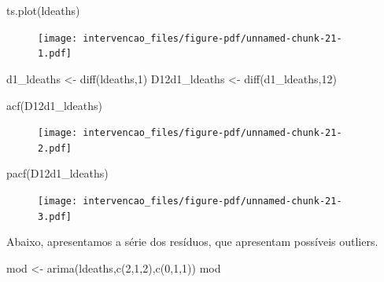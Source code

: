 \documentclass[
  letterpaper,
  DIV=11,
  numbers=noendperiod]{scrartcl}
\newenvironment{Shaded}{\begin{snugshade}}{\end{snugshade}}
\newcommand{\DecValTok}[1]{\textcolor[rgb]{0.68,0.00,0.00}{#1}}
\newcommand{\FunctionTok}[1]{\textcolor[rgb]{0.28,0.35,0.67}{#1}}
\newcommand{\NormalTok}[1]{\textcolor[rgb]{0.00,0.23,0.31}{#1}}
\newcommand{\OtherTok}[1]{\textcolor[rgb]{0.00,0.23,0.31}{#1}}
\theoremstyle{plain}
\theoremstyle{plain}
\theoremstyle{definition}
\theoremstyle{definition}
\theoremstyle{remark}
\begin{document}
\begin{Shaded}
\begin{Highlighting}[]
\FunctionTok{ts.plot}\NormalTok{(ldeaths)}
\end{Highlighting}
\end{Shaded}

\begin{figure}[H]

{\centering \texttt{[image: intervencao\_files/figure-pdf/unnamed-chunk-21-1.pdf]}

}

\end{figure}

\begin{Shaded}
\begin{Highlighting}[]
\NormalTok{d1\_ldeaths }\OtherTok{\textless{}{-}} \FunctionTok{diff}\NormalTok{(ldeaths,}\DecValTok{1}\NormalTok{)}
\NormalTok{D12d1\_ldeaths }\OtherTok{\textless{}{-}} \FunctionTok{diff}\NormalTok{(d1\_ldeaths,}\DecValTok{12}\NormalTok{)}

\FunctionTok{acf}\NormalTok{(D12d1\_ldeaths)}
\end{Highlighting}
\end{Shaded}

\begin{figure}[H]

{\centering \texttt{[image: intervencao\_files/figure-pdf/unnamed-chunk-21-2.pdf]}

}

\end{figure}

\begin{Shaded}
\begin{Highlighting}[]
\FunctionTok{pacf}\NormalTok{(D12d1\_ldeaths)}
\end{Highlighting}
\end{Shaded}

\begin{figure}[H]

{\centering \texttt{[image: intervencao\_files/figure-pdf/unnamed-chunk-21-3.pdf]}

}

\end{figure}

Abaixo, apresentamos a série dos resíduos, que apresentam possíveis
outliers.

\begin{Shaded}
\begin{Highlighting}[]
\NormalTok{mod }\OtherTok{\textless{}{-}} \FunctionTok{arima}\NormalTok{(ldeaths,}\FunctionTok{c}\NormalTok{(}\DecValTok{2}\NormalTok{,}\DecValTok{1}\NormalTok{,}\DecValTok{2}\NormalTok{),}\FunctionTok{c}\NormalTok{(}\DecValTok{0}\NormalTok{,}\DecValTok{1}\NormalTok{,}\DecValTok{1}\NormalTok{))}
\NormalTok{mod}
\end{Highlighting}
\end{Shaded}
\end{document}
